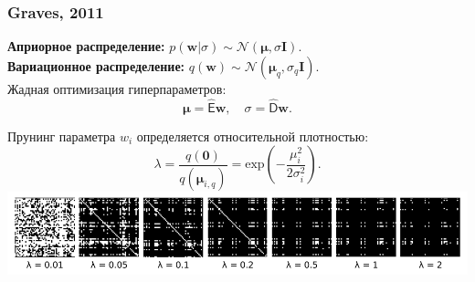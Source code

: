 \documentclass[usenames,dvipsnames,10pt,pdf,utf8,russian,aspectratio=43]{beamer}
\begin{document}
\begin{frame}
\frametitle{ Graves, 2011}


\textbf{Априорное распределение:} $p(\mathbf{w}|\sigma) \sim \mathcal{N}(\boldsymbol{\mu}, \sigma \mathbf{I}).$\\
\textbf{Вариационное распределение:} $q (\mathbf{w}) \sim \mathcal{N}(\boldsymbol{\mu}_q, \sigma_q \mathbf{I}).$\\
Жадная оптимизация гиперпараметров:
\[
	\boldsymbol{\mu} = \hat{\mathsf{E}} \mathbf{w},
\quad
	\sigma = \hat{\mathsf{D}} \mathbf{w}.
\]

Прунинг параметра ${w}_i$ определяется относительной плотностью:
\[
	\lambda = \frac{q(\mathbf{0})}{q(\boldsymbol{\mu}_{i,q})}  = \text{exp}(-\frac{\mu_i^2}{2\sigma_i^2}).
\]
\includegraphics[width=\textwidth]{graves.png}
\end{frame}
\end{document}
